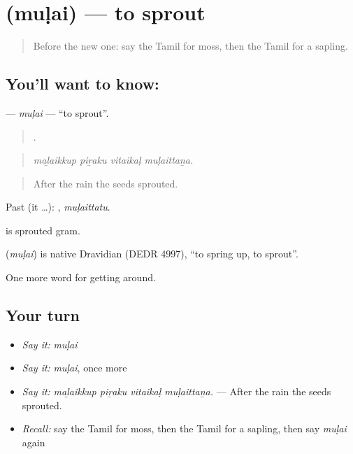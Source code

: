 \section[\texorpdfstring{\ta{முளை} (muḷai)}{முளை (muḷai)}]{ (muḷai) — to sprout}

\label{lesson:TA-C439-mulai}



\begin{quote}
Before the new one: say the Tamil for moss, then the Tamil for a sapling.
\end{quote}

\subsection*{You'll want to know: }
\textbf{} — \emph{muḷai} — \textquotedblleft{}to sprout\textquotedblright{}.

\begin{quote}
   .
\end{quote}

\begin{quote}
\emph{maḻaikkup piṟaku vitaikaḷ muḷaittaṉa.}
\end{quote}

\begin{quote}
After the rain the seeds sprouted.
\end{quote}

Past (it …): , \emph{muḷaittatu}.

  is sprouted gram.

\begin{cousinweb}
\textbf{} (\emph{muḷai}) is native Dravidian (DEDR 4997), \textquotedblleft{}to spring up, to sprout\textquotedblright{}.
\end{cousinweb}

\begin{grammarlens}[title={What you've built}]
One more word for getting around.
\end{grammarlens}

\subsection*{Your turn}
\begin{itemize}
\raggedright
  \item \emph{Say it:} \emph{muḷai}
  \item \emph{Say it:} \emph{muḷai}, once more
  \item \emph{Say it:} \emph{maḻaikkup piṟaku vitaikaḷ muḷaittaṉa.} — After the rain the seeds sprouted.
  \item \emph{Recall:} say the Tamil for moss, then the Tamil for a sapling, then say \emph{muḷai} again
\end{itemize}

